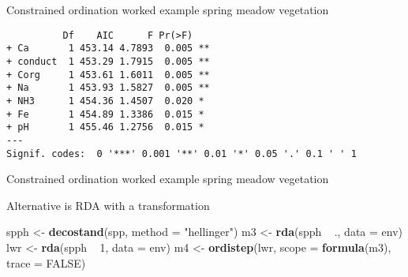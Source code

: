 \documentclass[10pt,ignorenonframetext,compress, aspectratio=169]{beamer}
\newenvironment{Shaded}{\begin{snugshade}}{\end{snugshade}}
\newcommand{\KeywordTok}[1]{\textcolor[rgb]{0.13,0.29,0.53}{\textbf{{#1}}}}
\newcommand{\DataTypeTok}[1]{\textcolor[rgb]{0.13,0.29,0.53}{{#1}}}
\newcommand{\DecValTok}[1]{\textcolor[rgb]{0.00,0.00,0.81}{{#1}}}
\newcommand{\StringTok}[1]{\textcolor[rgb]{0.31,0.60,0.02}{{#1}}}
\newcommand{\OtherTok}[1]{\textcolor[rgb]{0.56,0.35,0.01}{{#1}}}
\newcommand{\NormalTok}[1]{{#1}}
\begin{document}
\begin{frame}[fragile]{Constrained ordination worked example \textbar{}
spring meadow vegetation}

\scriptsize

\begin{Shaded}
\end{Shaded}

\begin{verbatim}
          Df    AIC      F Pr(>F)   
+ Ca       1 453.14 4.7893  0.005 **
+ conduct  1 453.29 1.7915  0.005 **
+ Corg     1 453.61 1.6011  0.005 **
+ Na       1 453.93 1.5827  0.005 **
+ NH3      1 454.36 1.4507  0.020 * 
+ Fe       1 454.89 1.3386  0.015 * 
+ pH       1 455.46 1.2756  0.015 * 
---
Signif. codes:  0 '***' 0.001 '**' 0.01 '*' 0.05 '.' 0.1 ' ' 1
\end{verbatim}

\normalsize

\end{frame}

\begin{frame}[fragile]{Constrained ordination worked example \textbar{}
spring meadow vegetation}

Alternative is RDA with a transformation

\scriptsize

\begin{Shaded}
\begin{Highlighting}[]
\NormalTok{spph <-}\StringTok{ }\KeywordTok{decostand}\NormalTok{(spp, }\DataTypeTok{method =} \StringTok{"hellinger"}\NormalTok{)}
\NormalTok{m3 <-}\StringTok{ }\KeywordTok{rda}\NormalTok{(spph ~}\StringTok{ }\NormalTok{., }\DataTypeTok{data =} \NormalTok{env)}
\NormalTok{lwr <-}\StringTok{ }\KeywordTok{rda}\NormalTok{(spph ~}\StringTok{ }\DecValTok{1}\NormalTok{, }\DataTypeTok{data =} \NormalTok{env)}
\NormalTok{m4 <-}\StringTok{ }\KeywordTok{ordistep}\NormalTok{(lwr, }\DataTypeTok{scope =} \KeywordTok{formula}\NormalTok{(m3), }\DataTypeTok{trace =} \OtherTok{FALSE}\NormalTok{)}
\end{Highlighting}
\end{Shaded}

\normalsize

\end{frame}
\end{document}
